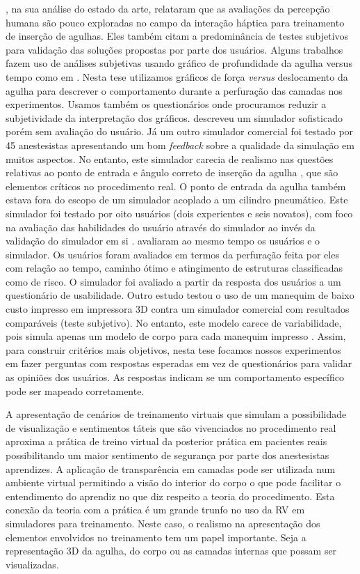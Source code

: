 \textcite{Correa2019}, na sua análise do estado da arte, relataram que as avaliações da percepção humana são pouco exploradas no campo da interação háptica para treinamento de inserção de agulhas. Eles também citam a predominância de testes subjetivos para validação das soluções propostas por parte dos usuários. Alguns trabalhos fazem uso de análises subjetivas usando gráfico de profundidade da agulha versus tempo como em \textcite{Magill2010}. Nesta tese utilizamos gráficos de força \textit{versus} deslocamento da agulha para descrever o comportamento durante a perfuração das camadas nos experimentos. Usamos também os questionários onde procuramos reduzir a subjetividade da interpretação dos gráficos. \textcite{N.2013} descreveu um simulador sofisticado porém sem avaliação do usuário. Já um outro simulador comercial foi testado por 45 anestesistas apresentando um bom \textit{feedback} sobre a qualidade da simulação em muitos aspectos. No entanto, este simulador carecia de realismo nas questões relativas ao ponto de entrada e ângulo correto de inserção da agulha \cite{Lee2012}, que são elementos críticos no procedimento real. O ponto de entrada da agulha também estava fora do escopo de um simulador acoplado a um cilindro pneumático. Este simulador foi testado por oito usuários (dois experientes e seis novatos), com foco na avaliação das habilidades do usuário através do simulador ao invés da validação do simulador em si \cite{Senac2019}. \cite{Farber2009} avaliaram ao mesmo tempo os usuários e o simulador. Os usuários foram avaliados em termos da perfuração feita por eles com relação ao tempo, caminho ótimo e atingimento de estruturas classificadas como de risco. O simulador foi avaliado a partir da resposta dos usuários a um questionário de usabilidade. Outro estudo testou o uso de um manequim de baixo custo impresso em impressora 3D contra um simulador comercial com resultados comparáveis (teste subjetivo). No entanto, este modelo carece de variabilidade, pois simula apenas um modelo de corpo para cada manequim impresso \cite{Mashari2018}. Assim, para construir critérios mais objetivos, nesta tese focamos nossos experimentos em fazer perguntas com respostas esperadas em vez de questionários para validar as opiniões dos usuários. As respostas indicam se um comportamento específico pode ser mapeado corretamente.

A apresentação de cenários de treinamento virtuais que simulam a possibilidade de visualização e sentimentos táteis que são vivenciados no procedimento real aproxima a prática de treino virtual da posterior prática em pacientes reais possibilitando um maior sentimento de segurança por parte dos anestesistas aprendizes. A aplicação de transparência em camadas pode ser utilizada num ambiente virtual permitindo a visão do interior do corpo o que pode facilitar o entendimento do aprendiz no que diz respeito a teoria do procedimento. Esta conexão da teoria com a prática é um grande trunfo no uso da \acrfull{RV} em simuladores para treinamento. Neste caso, o realismo na apresentação dos elementos envolvidos no treinamento tem um papel importante. Seja a representação 3D da agulha, do corpo ou as camadas internas que possam ser visualizadas. 

